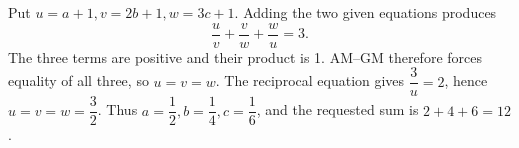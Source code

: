 Put $u=a+1,v=2b+1,w=3c+1$. Adding the two given equations produces
\[\dfrac{u}{v}+\dfrac{v}{w}+\dfrac{w}{u}=3.\]
The three terms are positive and their product is 1. AM--GM therefore forces equality of all three, so $u=v=w$. The reciprocal equation gives $\dfrac{3}{u}=2$, hence $u=v=w=\dfrac{3}{2}$. Thus $a=\dfrac{1}{2},b=\dfrac{1}{4},c=\dfrac{1}{6}$, and the requested sum is $2+4+6=\boxed{12}$.
